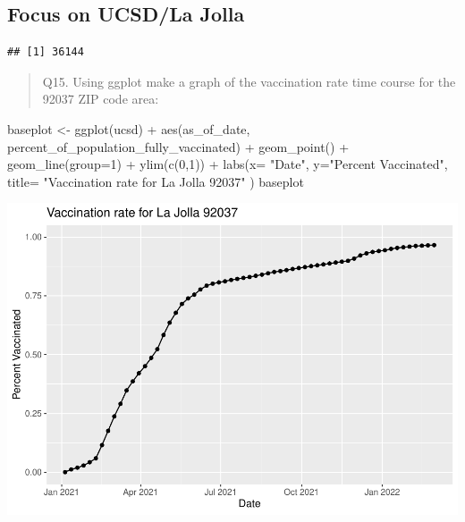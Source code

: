 \documentclass[
]{article}
\newenvironment{Shaded}{\begin{snugshade}}{\end{snugshade}}
\newcommand{\AttributeTok}[1]{\textcolor[rgb]{0.77,0.63,0.00}{#1}}
\newcommand{\DecValTok}[1]{\textcolor[rgb]{0.00,0.00,0.81}{#1}}
\newcommand{\FunctionTok}[1]{\textcolor[rgb]{0.00,0.00,0.00}{#1}}
\newcommand{\NormalTok}[1]{#1}
\newcommand{\OtherTok}[1]{\textcolor[rgb]{0.56,0.35,0.01}{#1}}
\newcommand{\SpecialCharTok}[1]{\textcolor[rgb]{0.00,0.00,0.00}{#1}}
\newcommand{\StringTok}[1]{\textcolor[rgb]{0.31,0.60,0.02}{#1}}
\begin{document}
\hypertarget{focus-on-ucsdla-jolla}{%
\subsection{Focus on UCSD/La Jolla}\label{focus-on-ucsdla-jolla}}

\begin{Shaded}
\end{Shaded}

\begin{verbatim}
## [1] 36144
\end{verbatim}

\begin{quote}
Q15. Using ggplot make a graph of the vaccination rate time course for
the 92037 ZIP code area:
\end{quote}

\begin{Shaded}
\begin{Highlighting}[]
\NormalTok{baseplot }\OtherTok{\textless{}{-}} \FunctionTok{ggplot}\NormalTok{(ucsd) }\SpecialCharTok{+}
  \FunctionTok{aes}\NormalTok{(as\_of\_date,}
\NormalTok{      percent\_of\_population\_fully\_vaccinated) }\SpecialCharTok{+}
  \FunctionTok{geom\_point}\NormalTok{() }\SpecialCharTok{+}
  \FunctionTok{geom\_line}\NormalTok{(}\AttributeTok{group=}\DecValTok{1}\NormalTok{) }\SpecialCharTok{+}
  \FunctionTok{ylim}\NormalTok{(}\FunctionTok{c}\NormalTok{(}\DecValTok{0}\NormalTok{,}\DecValTok{1}\NormalTok{)) }\SpecialCharTok{+}
  \FunctionTok{labs}\NormalTok{(}\AttributeTok{x=} \StringTok{"Date"}\NormalTok{, }\AttributeTok{y=}\StringTok{"Percent Vaccinated"}\NormalTok{, }\AttributeTok{title=} \StringTok{"Vaccination rate for La Jolla 92037"}\NormalTok{ )}
\NormalTok{baseplot}
\end{Highlighting}
\end{Shaded}

\includegraphics{COVID19-Vax-mini-project_files/figure-latex/unnamed-chunk-29-1.pdf}
\end{document}
